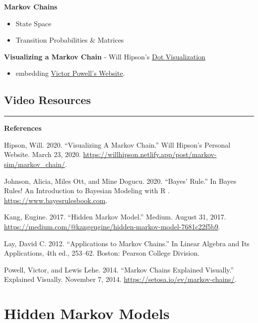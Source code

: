 \documentclass[
]{book}
\providecommand{\tightlist}{%
  \setlength{\itemsep}{0pt}\setlength{\parskip}{0pt}}
\begin{document}
\textbf{Markov Chains}

\begin{itemize}
\tightlist
\item
  State Space
\item
  Transition Probabilities \& Matrices
\end{itemize}

\textbf{Visualizing a Markov Chain}
- Will Hipson's \href{https://willhipson.netlify.app/post/markov-sim/markov_chain/}{Dot Visualization}

\begin{itemize}
\tightlist
\item
  embedding \href{https://setosa.io/markov/index.html\#\%7B\%22tm\%22\%3A\%5B\%5B0.5\%2C0.5\%5D\%2C\%5B0.5\%2C0.5\%5D\%5D\%7D}{Victor Powell's Website}.
\end{itemize}

\hypertarget{video-resources}{%
\section{Video Resources}\label{video-resources}}

\begin{center}\rule{0.5\linewidth}{0.5pt}\end{center}

\textbf{References}

Hipson, Will. 2020. ``Visualizing A Markov Chain.'' Will Hipson's Personal Website. March 23, 2020. \url{https://willhipson.netlify.app/post/markov-sim/markov_chain/}.

Johnson, Alicia, Miles Ott, and Mine Dogucu. 2020. ``Bayes' Rule.'' In Bayes Rules! An Introduction to Bayesian Modeling with R . \url{https://www.bayesrulesbook.com}.

Kang, Eugine. 2017. ``Hidden Markov Model.'' Medium. August 31, 2017. \url{https://medium.com/@kangeugine/hidden-markov-model-7681c22f5b9}.

Lay, David C. 2012. ``Applications to Markov Chains.'' In Linear Algebra and Its Applications, 4th ed., 253--62. Boston: Pearson College Division.

Powell, Victor, and Lewis Lehe. 2014. ``Markov Chains Explained Visually.'' Explained Visually. November 7, 2014. \url{https://setosa.io/ev/markov-chains/}.

\hypertarget{hidden-markov-models}{%
\chapter{Hidden Markov Models}\label{hidden-markov-models}}
\end{document}

